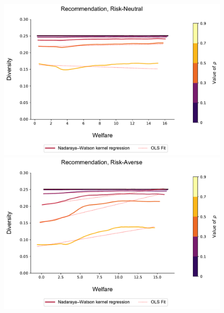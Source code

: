 \documentclass[sigconf, anonymous, review]{acmart}
\begin{document}
\begin{figure}[t]
\includegraphics[width=1.05\linewidth]{figures/diversity_welfare_rn_partial.pdf}\\
\includegraphics[width=1.05\linewidth]{figures/diversity_welfare_ra_partial.pdf}\\
\label{fig:diversity_welfare_ra_partial}
\end{figure}
\end{document}
